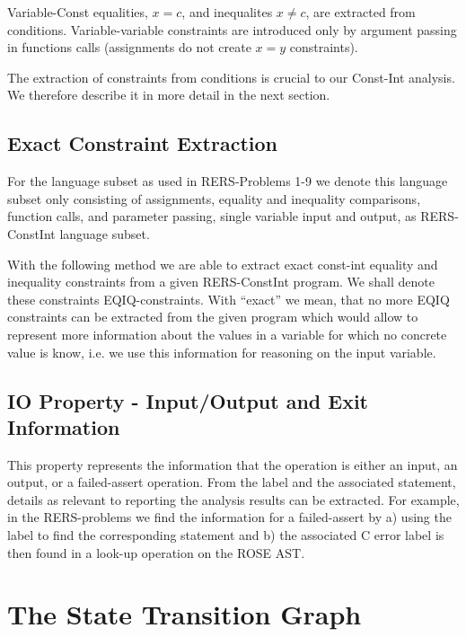 Variable-Const equalities, $x=c$, and inequalites $x\neq c$, are
extracted from conditions. Variable-variable constraints are
introduced only by argument passing in functions calls (assignments do
not create $x=y$ constraints).

The extraction of constraints from conditions is crucial to our
Const-Int analysis. We therefore describe it in more detail in the
next section.

\subsection{Exact Constraint Extraction}

For the language subset as used in RERS-Problems 1-9 we denote this
language subset only consisting of assignments, equality and
inequality comparisons, function calls, and parameter passing, single
variable input and output, as RERS-ConstInt language subset.

With the following method we are able to extract exact const-int
equality and inequality constraints from a given RERS-ConstInt
program. We shall denote these constraints EQIQ-constraints. With
``exact'' we mean, that no more EQIQ constraints can be extracted from
the given program which would allow to represent more information
about the values in a variable for which no concrete value is know,
i.e. we use this information for reasoning on the input variable.


\subsection{IO Property - Input/Output and Exit Information}

This property represents the information that the operation is either
an input, an output, or a failed-assert operation. From the label and
the associated statement, details as relevant to reporting the
analysis results can be extracted. For example, in the RERS-problems
we find the information for a failed-assert by a) using the label to
find the corresponding statement and b) the associated C error label
is then found in a look-up operation on the ROSE AST.

\section{The State Transition Graph}

\newcommand{\deqop}[0]{\#\#}
\newcommand{\eq}[0]{=}

